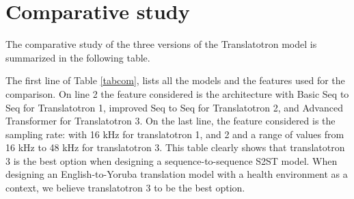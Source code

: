 \documentclass[12pt]{article}
\begin{document}
\section{Comparative study}
The comparative study of the three versions of the Translatotron model is summarized in the following table.

\begin{table}[H]
\centering
\caption{Comparison of Translatotron 1, Translatotron 2, and Translatotron 3}
\vspace{10pt}
\renewcommand{\arraystretch}{1.5} 

\label{tabcom}
\end{table}

The first line of Table \ref{tabcom}, lists all the models and the features used for the comparison. On line 2 the feature considered is the architecture with Basic Seq to Seq for Translatotron 1, improved Seq to Seq for Translatotron 2, and Advanced Transformer for Translatotron 3. On the last line, the feature considered is the sampling rate: with 16 kHz for translatotron 1, and 2 and a range of values from 16 kHz to 48 kHz for translatotron 3. This table clearly shows that translatotron 3 is the best option when designing a sequence-to-sequence S2ST model. When designing an English-to-Yoruba translation model with a health environment as a context, we believe translatotron 3 to be the best option. 
\end{document}
